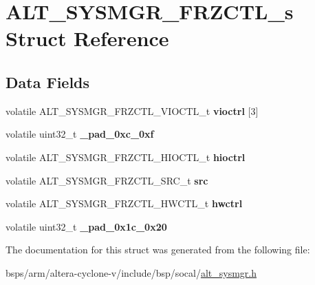 \hypertarget{structALT__SYSMGR__FRZCTL__s}{}\section{A\+L\+T\+\_\+\+S\+Y\+S\+M\+G\+R\+\_\+\+F\+R\+Z\+C\+T\+L\+\_\+s Struct Reference}
\label{structALT__SYSMGR__FRZCTL__s}
\subsection*{Data Fields}
\begin{DoxyCompactItemize}
\item 
\mbox{\label{structALT__SYSMGR__FRZCTL__s_ac583d325b9aab57ccbbade2a17c2e5ca}} 
volatile A\+L\+T\+\_\+\+S\+Y\+S\+M\+G\+R\+\_\+\+F\+R\+Z\+C\+T\+L\+\_\+\+V\+I\+O\+C\+T\+L\+\_\+t {\bfseries vioctrl} \mbox{[}3\mbox{]}
\item 
\mbox{\label{structALT__SYSMGR__FRZCTL__s_a9395371d41dc6a43e1a3775b99611e28}} 
volatile uint32\+\_\+t {\bfseries \+\_\+pad\+\_\+0xc\+\_\+0xf}
\item 
\mbox{\label{structALT__SYSMGR__FRZCTL__s_a6659852fb6596f9a6c9c02b9fcf68704}} 
volatile A\+L\+T\+\_\+\+S\+Y\+S\+M\+G\+R\+\_\+\+F\+R\+Z\+C\+T\+L\+\_\+\+H\+I\+O\+C\+T\+L\+\_\+t {\bfseries hioctrl}
\item 
\mbox{\label{structALT__SYSMGR__FRZCTL__s_a4ae66433b81fee08d5b04cae56672f37}} 
volatile A\+L\+T\+\_\+\+S\+Y\+S\+M\+G\+R\+\_\+\+F\+R\+Z\+C\+T\+L\+\_\+\+S\+R\+C\+\_\+t {\bfseries src}
\item 
\mbox{\label{structALT__SYSMGR__FRZCTL__s_a993c8be90d3df841552e7b042bfc1c73}} 
volatile A\+L\+T\+\_\+\+S\+Y\+S\+M\+G\+R\+\_\+\+F\+R\+Z\+C\+T\+L\+\_\+\+H\+W\+C\+T\+L\+\_\+t {\bfseries hwctrl}
\item 
\mbox{\label{structALT__SYSMGR__FRZCTL__s_a3de5bb383d184ffc232efbdb4c1c693a}} 
volatile uint32\+\_\+t {\bfseries \+\_\+pad\+\_\+0x1c\+\_\+0x20}
\end{DoxyCompactItemize}


The documentation for this struct was generated from the following file\+:\begin{DoxyCompactItemize}
\item 
bsps/arm/altera-\/cyclone-\/v/include/bsp/socal/\mbox{\hyperlink{alt__sysmgr_8h}{alt\+\_\+sysmgr.\+h}}\end{DoxyCompactItemize}
